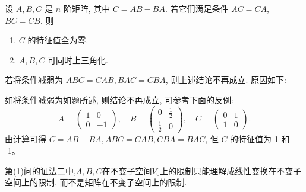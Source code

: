 \documentclass[../../main.tex]{subfiles}%
\begin{document}
\begin{proposition}\label{proposition:经典矩阵乘法可交换诱导的性质例题}
设 \(A, B, C\) 是 \(n\) 阶矩阵, 其中 \(C = AB - BA\). 若它们满足条件 $AC = CA$, $BC = CB$, 则
\begin{enumerate}[(1)]
\item \(C\) 的特征值全为零.

\item  \(A,B,C\) 可同时上三角化.
\end{enumerate}
\end{proposition}
\begin{remark}
若将条件减弱为 \(ABC = CAB, BAC = CBA\), 则上述结论不再成立. 原因如下:

如将条件减弱为如题所述, 则结论不再成立, 可参考下面的反例:
\[
A = \begin{pmatrix}
1 & 0 \\ 
0 & -1
\end{pmatrix}, \quad
B = \begin{pmatrix}
0 & \frac{1}{2} \\ 
\frac{1}{2} & 0
\end{pmatrix}, \quad
C = \begin{pmatrix}
0 & 1 \\ 
1 & 0
\end{pmatrix}.
\]
由计算可得 \(C = AB - BA, ABC = CAB, CBA = BAC\), 但 \(C\) 的特征值为 1 和 -1。
\end{remark}
\begin{remark}
第(1)问的{\color{blue}证法二}中,\(A,B,C\)在不变子空间\(V_{0}\)上的限制只能理解成线性变换在不变子空间上的限制, 而不是矩阵在不变子空间上的限制. 
\end{remark}
\end{document}
